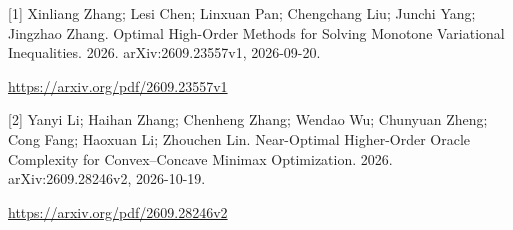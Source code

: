 \documentclass[10pt,a4paper]{article}
\begin{document}
[1] Xinliang Zhang; Lesi Chen; Linxuan Pan; Chengchang Liu; Junchi Yang; Jingzhao Zhang. Optimal High-Order Methods for Solving Monotone Variational Inequalities. 2026. arXiv:2609.23557v1, 2026-09-20.



\url{https://arxiv.org/pdf/2609.23557v1}



[2] Yanyi Li; Haihan Zhang; Chenheng Zhang; Wendao Wu; Chunyuan Zheng; Cong Fang; Haoxuan Li; Zhouchen Lin. Near-Optimal Higher-Order Oracle Complexity for Convex--Concave Minimax Optimization. 2026. arXiv:2609.28246v2, 2026-10-19.



\url{https://arxiv.org/pdf/2609.28246v2}
\end{document}
